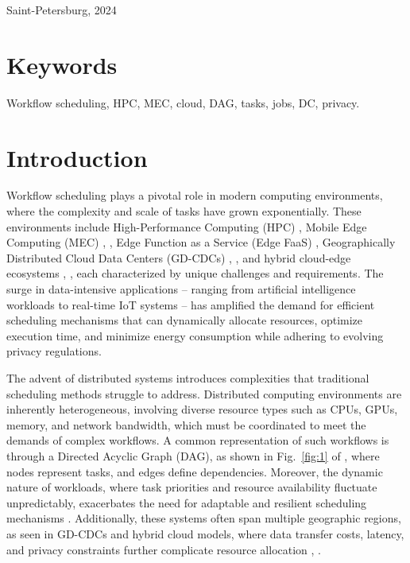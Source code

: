 \documentclass[a4paper, final]{article}
\begin{document}
\hfill \break
\begin{center} \small{Saint-Petersburg, 2024} \end{center}
\thispagestyle{empty} %

\newpage
\section*{Keywords}
Workflow scheduling, HPC, MEC, cloud, DAG, tasks, jobs, DC, privacy.

\newpage
\cleardoublepage
{}
{}
\section*{Introduction}
Workflow scheduling plays a pivotal role in modern computing environments, where the complexity and scale of tasks have 
grown exponentially. These environments include High-Performance Computing (HPC) \cite{bib:1_acrl}, Mobile Edge 
Computing (MEC) \cite{bib:2_faro}, \cite{bib:6_marine}, Edge Function as a Service (Edge FaaS) \cite{bib:4_faas}, 
Geographically Distributed Cloud Data Centers (GD-CDCs) \cite{bib:5_epee}, \cite{bib:7_ppps}, and hybrid cloud-edge 
ecosystems \cite{bib:8}, \cite{bib:9}, each characterized by unique challenges and requirements. The surge in data-intensive 
applications -- ranging from artificial intelligence workloads to real-time IoT systems -- has amplified the demand for 
efficient scheduling mechanisms that can dynamically allocate resources, optimize execution time, and minimize energy 
consumption while adhering to evolving privacy regulations.

The advent of distributed systems introduces complexities that traditional scheduling methods struggle to address. 
Distributed computing environments are inherently heterogeneous, involving diverse resource types such as CPUs, GPUs, 
memory, and network bandwidth, which must be coordinated to meet the demands of complex workflows. A 
common representation of such workflows is through a Directed Acyclic Graph (DAG), as shown in Fig.~\ref{fig:1} of  \cite{bib:1_acrl}, 
where nodes represent tasks, and edges define dependencies. Moreover, the dynamic nature of workloads, where task 
priorities and resource availability fluctuate unpredictably, exacerbates the need 
for adaptable and resilient scheduling mechanisms \cite{bib:3_sandcat}. Additionally, these systems often span 
multiple geographic regions, as seen in GD-CDCs and hybrid cloud models, where data transfer costs, latency, and 
privacy constraints further complicate resource allocation \cite{bib:7_ppps}, \cite{bib:9}.
\end{document}
